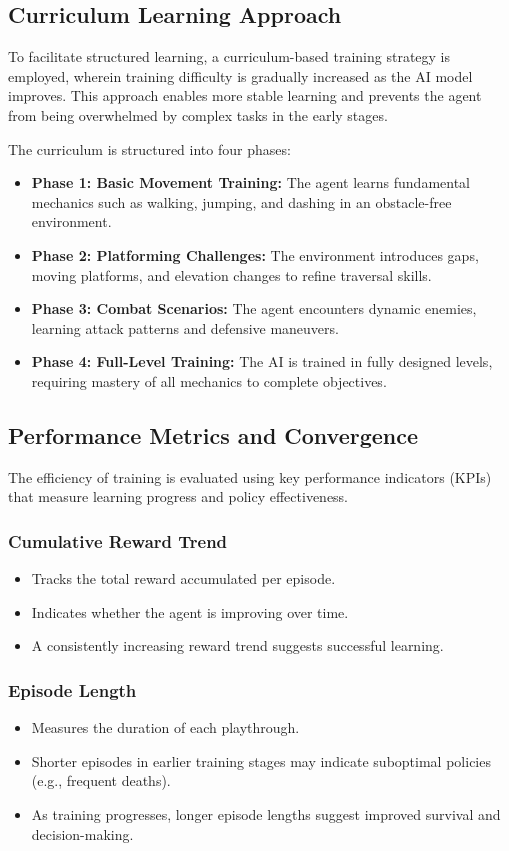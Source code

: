 \documentclass[12pt,oneside,openright,a4paper]{cpe-english-project}
\begin{document}
\subsection{Curriculum Learning Approach}
To facilitate structured learning, a curriculum-based training strategy is employed, wherein training difficulty is gradually increased as the AI model improves. This approach enables more stable learning and prevents the agent from being overwhelmed by complex tasks in the early stages.\par
The curriculum is structured into four phases:
\begin{itemize}
\item  \textbf{Phase 1: Basic Movement Training:} The agent learns fundamental mechanics such as walking, jumping, and dashing in an obstacle-free environment.
\item  \textbf{Phase 2: Platforming Challenges:} The environment introduces gaps, moving platforms, and elevation changes to refine traversal skills.
\item  \textbf{Phase 3: Combat Scenarios:} The agent encounters dynamic enemies, learning attack patterns and defensive maneuvers.
\item  \textbf{Phase 4: Full-Level Training:} The AI is trained in fully designed levels, requiring mastery of all mechanics to complete objectives.
\end{itemize}
\subsection{Performance Metrics and Convergence}
The efficiency of training is evaluated using key performance indicators (KPIs) that measure learning progress and policy effectiveness.\par
\subsubsection{Cumulative Reward Trend}
\begin{itemize}
\item  Tracks the total reward accumulated per episode.
\item  Indicates whether the agent is improving over time.
\item  A consistently increasing reward trend suggests successful learning.
\end{itemize}
\subsubsection{Episode Length}
\begin{itemize}
\item  Measures the duration of each playthrough.
\item  Shorter episodes in earlier training stages may indicate suboptimal policies (e.g., frequent deaths).
\item  As training progresses, longer episode lengths suggest improved survival and decision-making.
\end{itemize}
\end{document}
